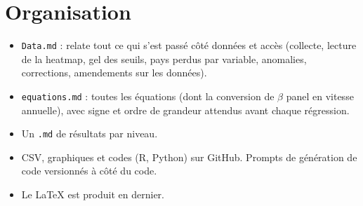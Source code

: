 \documentclass[14pt,a4paper]{article}
\newcommand{\bet}{\texorpdfstring{$\beta$}{beta}}
\begin{document}
	\section{Organisation}
	
	\begin{itemize}
		\item \texttt{Data.md} : relate tout ce qui s'est passé côté données et accès (collecte, lecture de la heatmap, gel des seuils, pays perdus par variable, anomalies, corrections, amendements sur les données).
		\item \texttt{equations.md} : toutes les équations (dont la conversion de \bet{} panel en vitesse annuelle), avec signe et ordre de grandeur attendus avant chaque régression.
		\item Un \texttt{.md} de résultats par niveau.
		\item CSV, graphiques et codes (R, Python) sur GitHub. Prompts de génération de code versionnés à côté du code.
		\item Le \LaTeX{} est produit en dernier.
	\end{itemize}
	
\end{document}
